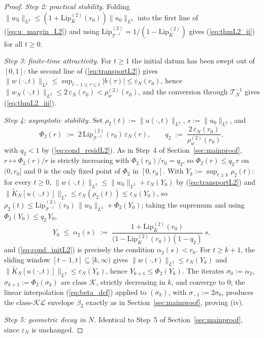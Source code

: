 \documentclass[10pt,a4paper]{amsart}
\newcommand{\Tcal}{\mathcal{T}}
\newcommand{\Ltwo}{L^2}
\newcommand{\Lipk}{\mathrm{Lip}_K}
\newcommand{\LipT}{\mathrm{Lip}_{\Tcal^{-1}}}
\newcommand{\eps}{\varepsilon}
\begin{document}
\begin{proof}
\emph{Step 2: practical stability.} Folding $\|w_0\|_{\Ltwo} \le (1 + \Lipk^{(2)}(r_0))\|u_0\|_{\Ltwo}$ into the first line of (\ref{eq:u_margin_L2}) and using $\LipT^{(2)} = 1/(1 - \Lipk^{(2)})$ gives (\ref{eq:thmL2_ii}) for all $t \ge 0$.

\emph{Step 3: finite-time attractivity.} For $t \ge 1$ the initial datum has been swept out of $[0,1]$: the second line of (\ref{eq:transportL2}) gives $\|w(\cdot,t)\|_{\Ltwo} \le \sup_{t-1 \le \tau \le t}|b(\tau)| \le \eps_N(r_0)$, hence $\|w_N(\cdot,t)\|_{\Ltwo} \le 2\,\eps_N(r_0) < \rho_w^{(2)}(r_0)$, and the conversion through $\Tcal_N^{-1}$ gives (\ref{eq:thmL2_iii}).

\emph{Step 4: asymptotic stability.} Set $\rho_2(t) := \|u(\cdot,t)\|_{\Ltwo}$, $s := \|u_0\|_{\Ltwo}$, and
\begin{equation}
\Phi_2(r) \;:=\; 2\,\LipT^{(2)}(r_0)\,\eps_N(r), \qquad q_2 \;:=\; \frac{2\,\eps_N(r_0)}{\rho_w^{(2)}(r_0)},
\label{eq:Phi2def}
\end{equation}
with $q_2 < 1$ by (\ref{eq:cond_residL2}). As in Step~4 of Section~\ref{sec:mainproof}, $r \mapsto \Phi_2(r)/r$ is strictly increasing with $\Phi_2(r_0)/r_0 = q_2$, so $\Phi_2(r) \le q_2\, r$ on $(0, r_0]$ and $0$ is the only fixed point of $\Phi_2$ in $[0, r_0]$. With $Y_k := \sup_{t \ge k}\rho_2(t)$: for every $t \ge 0$, $\|w(\cdot,t)\|_{\Ltwo} \le \|w_0\|_{\Ltwo} + \eps_N(Y_0)$ by (\ref{eq:transportL2}) and $\|\widetilde K_N[u(\cdot,t)]\|_{\Ltwo} \le \eps_N(\rho_2(t)) \le \eps_N(Y_0)$, so $\rho_2(t) \le \LipT^{(2)}(r_0)\,\|w_0\|_{\Ltwo} + \Phi_2(Y_0)$; taking the supremum and using $\Phi_2(Y_0) \le q_2\, Y_0$,
\begin{equation}
Y_0 \;\le\; \alpha_2(s) \;:=\; \frac{1 + \Lipk^{(2)}(r_0)}{\bigl(1 - \Lipk^{(2)}(r_0)\bigr)\,(1 - q_2)}\; s,
\label{eq:alpha2def}
\end{equation}
and (\ref{eq:cond_initL2}) is precisely the condition $\alpha_2(s) < r_0$. For $t \ge k+1$, the sliding window $[t-1, t] \subseteq [k, \infty)$ gives $\|w(\cdot,t)\|_{\Ltwo} \le \eps_N(Y_k)$ and $\|\widetilde K_N[u(\cdot,t)]\|_{\Ltwo} \le \eps_N(Y_k)$, hence $Y_{k+1} \le \Phi_2(Y_k)$. The iterates $\sigma_0 := \alpha_2$, $\sigma_{k+1} := \Phi_2(\sigma_k)$ are class $\mathcal{K}$, strictly decreasing in $k$, and converge to $0$; the linear interpolation (\ref{eq:beta_def}) applied to $(\sigma_k)$, with $\sigma_{-1} := 2\sigma_0$, produces the class-$\mathcal{KL}$ envelope $\beta_2$ exactly as in Section~\ref{sec:mainproof}, proving (iv).

\emph{Step 5: geometric decay in $N$.} Identical to Step~5 of Section~\ref{sec:mainproof}, since $\eps_N$ is unchanged.
\end{proof}
\end{document}
